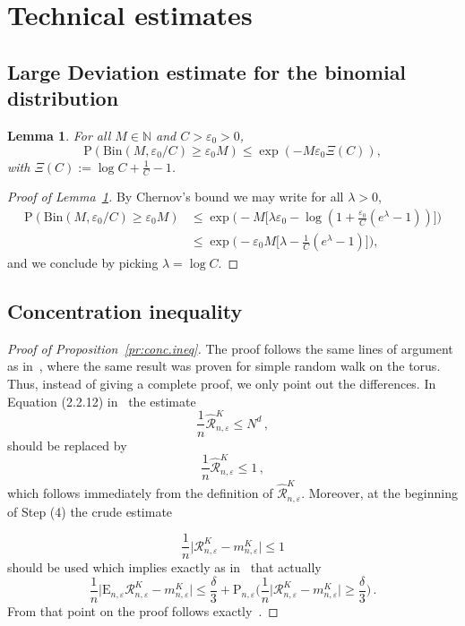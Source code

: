 \documentclass[a4paper,11pt]{amsart}
\numberwithin{equation}{section}
\newtheorem{lemma}[theorem]{Lemma}
\newcommand{\bbN}{{\ensuremath{\mathbb N}} }
\newcommand{\cR}{{\ensuremath{\mathcal R}} }
\newcommand{\gep}{\varepsilon}
\newcommand{\gl}{\lambda}
\newcommand\bP{\ensuremath{\mathrm{P}}}
\newcommand\bE{\ensuremath{\mathrm{E}}}
\newcommand{\8}{\infty}
\newcommand{\beq}{\begin{equation}}
\newcommand{\eeq}{\end{equation}}
\newcommand{\ba}{\begin{aligned}}
\newcommand{\ea}{\end{aligned}}
\newcommand{\bin}{\mathrm{Bin}}
\begin{document}
%
\appendix

\section{Technical estimates}
\subsection{Large Deviation estimate for the binomial distribution}
\begin{lemma}
\label{lem:LDest}
For all $M\in\bbN$ and $C>\gep_0>0$, 
\beq
\bP(\bin(M,\gep_0/C)\ge \gep_0M) \le \exp(-M\gep_0 \Xi(C)),
\eeq
with $\Xi(C):=\log C+\tfrac1C-1$.
\end{lemma}
\begin{proof}[Proof of Lemma~\ref{lem:LDest}]
By Chernov's bound we may write for all $\gl>0$,
\beq
\ba
\bP(\bin(M,\gep_0/C)\ge \gep_0M) &\le 
\exp\Big(-M\Big[\gl\gep_0 - \log(1+ \tfrac{\gep_0}{C}(e^\gl-1))\Big]\Big)\\
&\le 
\exp\Big(-\gep_0M\Big[\gl - \tfrac{1}{C}(e^\gl-1)\Big]\Big),
\ea
\eeq
and we conclude by picking $\gl = \log C$.
\end{proof}

\subsection{Concentration inequality}
\label{sec:app-con-ine}
%
\begin{proof}[Proof of Proposition~\ref{pr:conc.ineq}]
The proof follows the same lines of argument as in~\cite[Proposition 2.2.2]{Phetpradap}, where the same result was proven for simple random walk on the torus. Thus, instead of giving a complete proof, we only point out the differences. In Equation (2.2.12) in~\cite{Phetpradap} the estimate 
\begin{equation}
\frac{1}{n} \hat{\cR}_{n,\gep}^K \leq N^d\,,
\end{equation}
should be replaced by
\begin{equation}
\frac{1}{n}\hat{\cR}_{n,\gep}^K\leq 1\,,
\end{equation}
which follows immediately from the definition of $\hat{\cR}_{n,\gep}^K$. Moreover, at the beginning of Step (4) the crude estimate

\begin{equation}
\frac{1}{n} \Big|\cR_{n,\gep}^K-m_{n,\gep}^K\Big| \leq 1
\end{equation}
%
should be used which implies exactly as in~\cite{Phetpradap} that actually
\begin{equation}
\frac{1}{n} \Big|\bE_{n,\gep}\cR_{n,\gep}^K-m_{n,\gep}^K\Big| \leq \frac{\delta}{3} + \bP_{n,\gep}\Big(\frac{1}{n} \Big|\cR_{n,\gep}^K-m_{n,\gep}^K\Big|\geq \frac{\delta}{3}\Big)\,.
\end{equation}
From that point on the proof follows exactly~\cite{Phetpradap}.
\end{proof}
\end{document}
